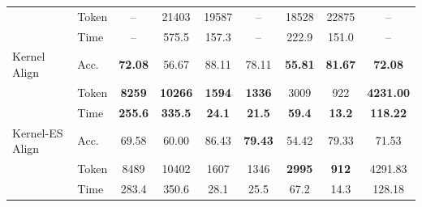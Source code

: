 \documentclass{article} %
\begin{document}
\begin{table}[t]
{{\begin{tabular}{@{}ll*{7}{c}@{}}
 & Token & -- & 21403 & 19587 & -- & 18528 & 22875 & -- \\
 & Time & -- & 575.5 & 157.3 & -- & 222.9 & 151.0 & -- \\
\midrule
Kernel Align & Acc. & \textbf{72.08} & 56.67 & 88.11 & 78.11 & \textbf{55.81} & \textbf{81.67} & \textbf{72.08} \\
 & Token & \textbf{8259} & \textbf{10266} & \textbf{1594} & \textbf{1336} & 3009 & 922 & \textbf{4231.00} \\
 & Time & \textbf{255.6} & \textbf{335.5} & \textbf{24.1} & \textbf{21.5} & \textbf{59.4} & \textbf{13.2} & \textbf{118.22} \\
\midrule
Kernel-ES Align & Acc. & 69.58 & 60.00 & 86.43 & \textbf{79.43} & 54.42 & 79.33 & 71.53 \\
 & Token & 8489 & 10402 & 1607 & 1346 & \textbf{2995} & \textbf{912} & 4291.83 \\
 & Time & 283.4 & 350.6 & 28.1 & 25.5 & 67.2 & 14.3 & 128.18 \\
\bottomrule
\end{tabular}%
}%
}
\end{table}
\end{document}
